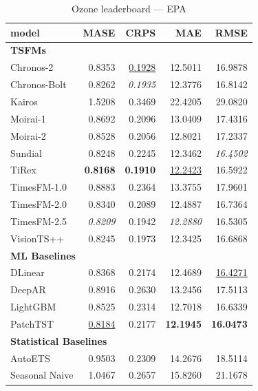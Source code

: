 \begin{table}[H]
\caption{Ozone leaderboard --- EPA}
\centering
\begin{small}
\begin{tabular}{lrrrr}
\toprule
model & MASE & CRPS & MAE & RMSE \\
\midrule
\multicolumn{5}{l}{\textbf{TSFMs}} \\
Chronos-2 & 0.8353 & \underline{0.1928} & 12.5011 & 16.9878 \\
Chronos-Bolt & 0.8262 & \textit{0.1935} & 12.3776 & 16.8142 \\
Kairos & 1.5208 & 0.3469 & 22.4205 & 29.0820 \\
Moirai-1 & 0.8692 & 0.2096 & 13.0409 & 17.4316 \\
Moirai-2 & 0.8528 & 0.2056 & 12.8021 & 17.2337 \\
Sundial & 0.8248 & 0.2245 & 12.3462 & \textit{16.4502} \\
TiRex & \textbf{0.8168} & \textbf{0.1910} & \underline{12.2423} & 16.5922 \\
TimesFM-1.0 & 0.8883 & 0.2364 & 13.3755 & 17.9601 \\
TimesFM-2.0 & 0.8340 & 0.2089 & 12.4887 & 16.7364 \\
TimesFM-2.5 & \textit{0.8209} & 0.1942 & \textit{12.2880} & 16.5305 \\
VisionTS++ & 0.8245 & 0.1973 & 12.3425 & 16.6868 \\
\midrule
\multicolumn{5}{l}{\textbf{ML Baselines}} \\
DLinear & 0.8368 & 0.2174 & 12.4689 & \underline{16.4271} \\
DeepAR & 0.8916 & 0.2630 & 13.2456 & 17.5113 \\
LightGBM & 0.8525 & 0.2314 & 12.7018 & 16.6339 \\
PatchTST & \underline{0.8184} & 0.2177 & \textbf{12.1945} & \textbf{16.0473} \\
\midrule
\multicolumn{5}{l}{\textbf{Statistical Baselines}} \\
AutoETS & 0.9503 & 0.2309 & 14.2676 & 18.5114 \\
Seasonal Naive & 1.0467 & 0.2657 & 15.8260 & 21.1678 \\
\bottomrule
\end{tabular}
\end{small}
\end{table}